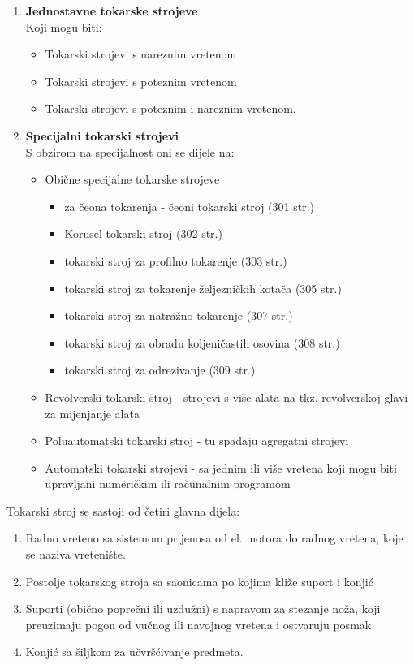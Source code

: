 \documentclass[a4paper,12pt]{article}
\numberwithin{figure}{section}
\begin{document}
\begin{enumerate}
\item \textbf{Jednostavne tokarske strojeve}\\
Koji mogu biti:
\begin{itemize}
\item Tokarski strojevi s nareznim vretenom
\item Tokarski strojevi s poteznim vretenom
\item Tokarski strojevi s poteznim i nareznim vretenom.
\end{itemize}
\item \textbf{Specijalni tokarski strojevi}\\
S obzirom na specijalnost oni se dijele na:
\begin{itemize}
\item Obične specijalne tokarske strojeve
\begin{itemize}
\item za čeona tokarenja - čeoni tokarski stroj (301 str.)
\item Korusel tokarski stroj (302 str.)
\item tokarski stroj za profilno tokarenje (303 str.)
\item tokarski stroj za tokarenje željezničkih kotača (305 str.)
\item tokarski stroj za natražno tokarenje (307 str.)
\item tokarski stroj za obradu koljeničastih osovina (308 str.)
\item tokarski stroj za odrezivanje (309 str.)
\end{itemize}
\item Revolverski tokarski stroj - strojevi s više alata na tkz. revolverskoj glavi za mijenjanje alata
\item Poluautomatski tokarski stroj - tu spadaju agregatni strojevi
\item Automatski tokarski strojevi - sa jednim ili više vretena koji mogu biti upravljani numeričkim ili računalnim programom
\end{itemize}
\end{enumerate}
Tokarski stroj se sastoji od četiri glavna dijela:
\begin{enumerate}
\item Radno vreteno sa sistemom prijenosa od el. motora do radnog vretena, koje se naziva vretenište.
\item Postolje tokarskog stroja sa saonicama po kojima kliže suport i konjić
\item Suporti (obično poprečni ili uzdužni) s napravom za stezanje noža, koji preuzimaju pogon od vučnog ili navojnog vretena i ostvaruju posmak
\item Konjić sa šiljkom za učvršćivanje predmeta.
\end{enumerate}
\end{document}
